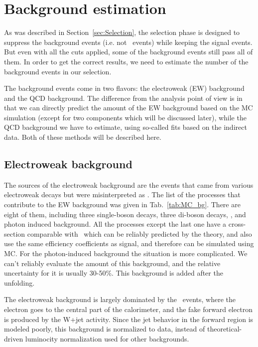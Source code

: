 \chapter{Background estimation}
\label{sec:Bkg}

As was described in Section~\ref{sec:Selection}, the selection phase is designed to suppress the background events (i.e. not \Zee\ events) while keeping the signal events. But even with all the cuts applied, some of the background events still pass all of them. In order to get the correct results, we need to estimate the number of the background events in our selection.

The background events come in two flavors: the electroweak (EW) background and the QCD background. The difference from the analysis point of view is in that we can directly predict the amount of the EW background based on the MC simulation (except for two components which will be discussed later), while the QCD background we have to estimate, using so-called fits based on the indirect data. Both of these methods will be described here.

\section{Electroweak background}

The sources of the electroweak background are the events that came from various electroweak decays but were misinterpreted as \Zee. The list of the processes that contribute to the EW background was given in Tab.~\ref{tab:MC_bg}. There are eight of them, including three single-boson decays, three di-boson decays, \ttbar, and photon induced background. All the processes except the last one have a cross-section comparable with \Zee\ which can be reliably predicted by the theory, and also use the same efficiency coefficients as signal, and therefore can be simulated using MC. For the photon-induced background the situation is more complicated. We can't reliably evaluate the amount of this background, and the relative uncertainty for it is usually 30-50\%. This background is added after the unfolding.

The electroweak background is largely dominated by the \Wenu\ events, where the electron goes to the central part of the calorimeter, and the fake forward electron is produced by the W+jet activity. Since the jet behavior in the forward region is modeled poorly, this background is normalized to data, instead of theoretical-driven luminocity normalization used for other backgrounds.

